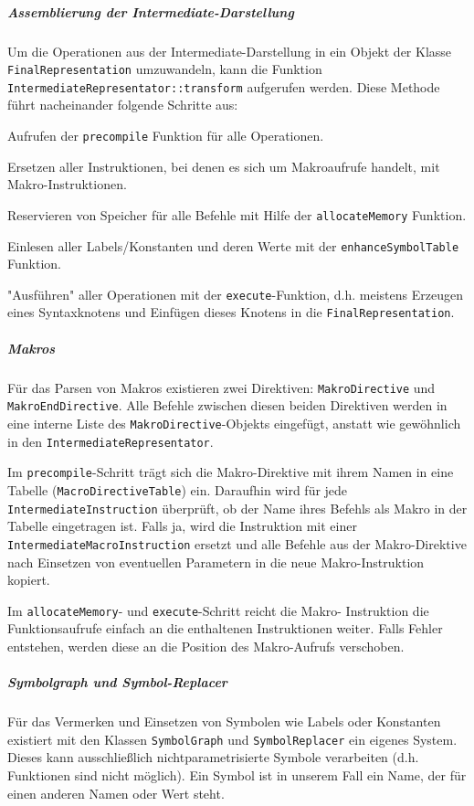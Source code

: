 \pagebreak
\subparagraph{Assemblierung der Intermediate-Darstellung}
\label{dev:dev_parser_assem_inter} Um die Operationen aus der
Intermediate-Darstellung in ein Objekt der Klasse \texttt{FinalRepresentation}
umzuwandeln, kann die Funktion
\texttt{IntermediateRepresentator::\allowbreak{}transform} aufgerufen werden.
Diese Methode führt nacheinander folgende Schritte aus:
\begin{senumerate}{-0.2cm}
	\item Aufrufen der \texttt{precompile} Funktion für alle Operationen. \item
	Ersetzen aller Instruktionen, bei denen es sich um Makroaufrufe handelt, mit
	Makro-Instruktionen. \item Reservieren von Speicher für alle Befehle mit
	Hilfe der \texttt{allocateMemory} Funktion. \item Einlesen aller
	Labels/Konstanten und deren Werte mit der \texttt{enhanceSymbolTable}
	Funktion. \item "Ausführen" aller Operationen mit der
	\texttt{execute}-Funktion, d.h. meistens Erzeugen eines Syntaxknotens und
	Einfügen dieses Knotens in die \texttt{FinalRepresentation}.
\end{senumerate}

\subparagraph{Makros} Für das Parsen von Makros existieren zwei Direktiven:
\texttt{Makro\-Directive} und \texttt{Makro\-End\-Directive}. Alle Befehle
zwischen diesen beiden Direktiven werden in eine interne Liste des
\texttt{Makro\-Directive}-Objekts eingefügt, anstatt wie gewöhnlich in den
\texttt{Intermediate\-Representator}.

Im \texttt{precompile}-Schritt trägt sich die Makro-Direktive mit ihrem Namen in
eine Tabelle (\texttt{Macro\-Directive\-Table}) ein. Daraufhin wird für jede
\texttt{Intermediate\-Instruction} überprüft, ob der Name ihres Befehls als
Makro in der Tabelle eingetragen ist. Falls ja, wird die Instruktion mit einer
\texttt{Intermediate\-Macro\-Instruction} ersetzt und alle Befehle aus der
Makro-Direktive nach Einsetzen von eventuellen Parametern in die neue
Makro-Instruktion kopiert.

Im \texttt{allocateMemory}- und \texttt{execute}-Schritt reicht die Makro-
Instruktion die Funktionsaufrufe einfach an die enthaltenen Instruktionen
weiter. Falls Fehler entstehen, werden diese an die Position des Makro-Aufrufs
verschoben.

\subparagraph{Symbolgraph und Symbol-Replacer} Für das Vermerken und Einsetzen
von Symbolen wie Labels oder Konstanten existiert mit den Klassen
\texttt{SymbolGraph} und \texttt{SymbolReplacer} ein eigenes System. Dieses kann
ausschließlich nichtparametrisierte Symbole verarbeiten (d.h. Funktionen sind
nicht möglich). Ein Symbol ist in unserem Fall ein Name, der für einen anderen
Namen oder Wert steht.

